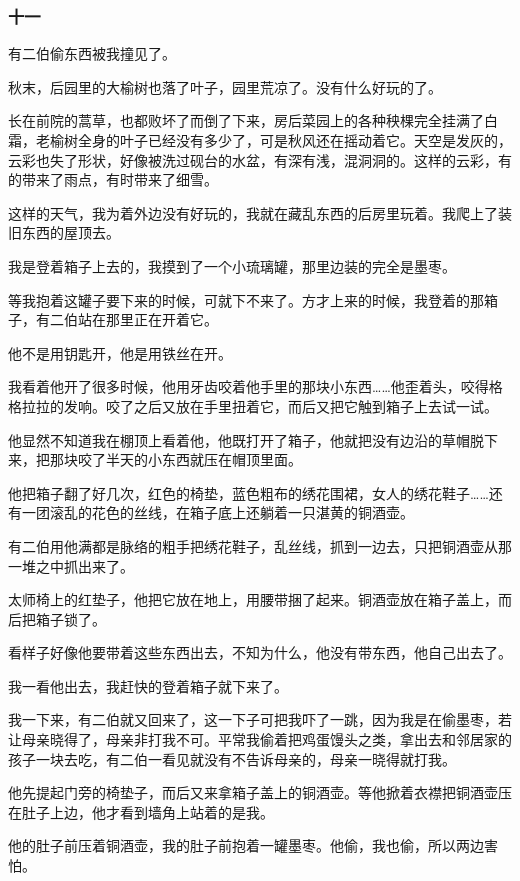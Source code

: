 \subsubsection*{十一}
\par 有二伯偷东西被我撞见了。
\par 秋末，后园里的大榆树也落了叶子，园里荒凉了。没有什么好玩的了。
\par 长在前院的蒿草，也都败坏了而倒了下来，房后菜园上的各种秧棵完全挂满了白霜，老榆树全身的叶子已经没有多少了，可是秋风还在摇动着它。天空是发灰的，云彩也失了形状，好像被洗过砚台的水盆，有深有浅，混洞洞的。这样的云彩，有的带来了雨点，有时带来了细雪。
\par 这样的天气，我为着外边没有好玩的，我就在藏乱东西的后房里玩着。我爬上了装旧东西的屋顶去。
\par 我是登着箱子上去的，我摸到了一个小琉璃罐，那里边装的完全是墨枣。
\par 等我抱着这罐子要下来的时候，可就下不来了。方才上来的时候，我登着的那箱子，有二伯站在那里正在开着它。
\par 他不是用钥匙开，他是用铁丝在开。
\par 我看着他开了很多时候，他用牙齿咬着他手里的那块小东西……他歪着头，咬得格格拉拉的发响。咬了之后又放在手里扭着它，而后又把它触到箱子上去试一试。
\par 他显然不知道我在棚顶上看着他，他既打开了箱子，他就把没有边沿的草帽脱下来，把那块咬了半天的小东西就压在帽顶里面。
\par 他把箱子翻了好几次，红色的椅垫，蓝色粗布的绣花围裙，女人的绣花鞋子……还有一团滚乱的花色的丝线，在箱子底上还躺着一只湛黄的铜酒壶。
\par 有二伯用他满都是脉络的粗手把绣花鞋子，乱丝线，抓到一边去，只把铜酒壶从那一堆之中抓出来了。
\par 太师椅上的红垫子，他把它放在地上，用腰带捆了起来。铜酒壶放在箱子盖上，而后把箱子锁了。
\par 看样子好像他要带着这些东西出去，不知为什么，他没有带东西，他自己出去了。
\par 我一看他出去，我赶快的登着箱子就下来了。
\par 我一下来，有二伯就又回来了，这一下子可把我吓了一跳，因为我是在偷墨枣，若让母亲晓得了，母亲非打我不可。平常我偷着把鸡蛋馒头之类，拿出去和邻居家的孩子一块去吃，有二伯一看见就没有不告诉母亲的，母亲一晓得就打我。
\par 他先提起门旁的椅垫子，而后又来拿箱子盖上的铜酒壶。等他掀着衣襟把铜酒壶压在肚子上边，他才看到墙角上站着的是我。
\par 他的肚子前压着铜酒壶，我的肚子前抱着一罐墨枣。他偷，我也偷，所以两边害怕。
